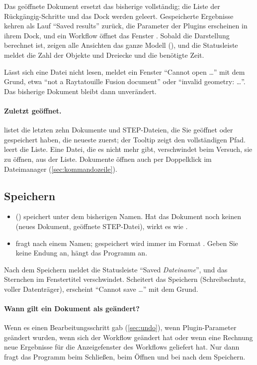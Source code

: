 Das geöffnete Dokument ersetzt das bisherige vollständig; die Liste der Rückgängig-Schritte
und das Dock  werden geleert. Gespeicherte Ergebnisse kehren als Lauf
\enquote{Saved results} zurück, die Parameter der Plugins erscheinen in ihrem Dock, und ein
Workflow öffnet das Fenster . Sobald die Darstellung berechnet ist, zeigen
alle Ansichten das ganze Modell (), und die Statusleiste meldet die Zahl der
Objekte und Dreiecke und die benötigte Zeit.

Lässt sich eine Datei nicht lesen, meldet ein Fenster \enquote{Cannot open \dots} mit dem
Grund, etwa \enquote{not a Raytatouille Fusion document} oder \enquote{invalid geometry:
\dots}. Das bisherige Dokument bleibt dann unverändert.

\paragraph{Zuletzt geöffnet.}  listet die letzten zehn Dokumente und
STEP-Dateien, die Sie geöffnet oder gespeichert haben, die neueste zuerst; der Tooltip zeigt den
vollständigen Pfad.  leert die Liste. Eine Datei, die es nicht mehr gibt,
verschwindet beim Versuch, sie zu öffnen, aus der Liste. Dokumente öffnen auch per Doppelklick
im Dateimanager (\autoref{sec:kommandozeile}).

\subsection{Speichern}

\begin{itemize}
  \item {} () speichert unter dem bisherigen Namen. Hat das
    Dokument noch keinen (neues Dokument, geöffnete STEP-Datei), wirkt es wie .
  \item {} fragt nach einem Namen; gespeichert wird immer im Format
    . Geben Sie keine Endung an, hängt das Programm  an.
\end{itemize}

Nach dem Speichern meldet die Statusleiste \enquote{Saved \textit{Dateiname}}, und das
Sternchen im Fenstertitel verschwindet. Scheitert das Speichern (Schreibschutz, voller
Datenträger), erscheint \enquote{Cannot save \dots} mit dem Grund.

\paragraph{Wann gilt ein Dokument als geändert?} Wenn es einen Bearbeitungsschritt gab
(\autoref{sec:undo}), wenn Plugin-Parameter geändert wurden, wenn sich der Workflow geändert
hat oder wenn eine Rechnung neue Ergebnisse für die Anzeigefenster des Workflows geliefert
hat. Nur dann fragt das Programm beim Schließen, beim Öffnen und bei  nach dem
Speichern.

